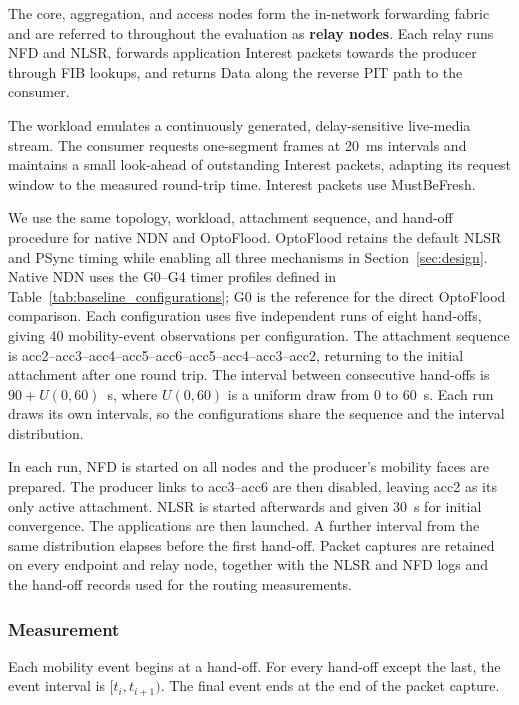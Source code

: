 \documentclass[10pt,conference]{IEEEtran}
\begin{document}
The core, aggregation, and access nodes form the in-network forwarding fabric and are referred to throughout the evaluation as \textbf{relay nodes}. Each relay runs NFD and NLSR, forwards application Interest packets towards the producer through FIB lookups, and returns Data along the reverse PIT path to the consumer.

The workload emulates a continuously generated, delay-sensitive live-media stream. The consumer requests one-segment frames at 20~ms intervals and maintains a small look-ahead of outstanding Interest packets, adapting its request window to the measured round-trip time. Interest packets use MustBeFresh.

We use the same topology, workload, attachment sequence, and hand-off procedure for native NDN and OptoFlood. OptoFlood retains the default NLSR and PSync timing while enabling all three mechanisms in Section~\ref{sec:design}. Native NDN uses the G0--G4 timer profiles defined in Table~\ref{tab:baseline_configurations}; G0 is the reference for the direct OptoFlood comparison. Each configuration uses five independent runs of eight hand-offs, giving 40 mobility-event observations per configuration. The attachment sequence is acc2--acc3--acc4--acc5--acc6--acc5--acc4--acc3--acc2, returning to the initial attachment after one round trip. The interval between consecutive hand-offs is $90 + U(0,60)$~s, where $U(0,60)$ is a uniform draw from 0 to 60~s. Each run draws its own intervals, so the configurations share the sequence and the interval distribution.

In each run, NFD is started on all nodes and the producer's mobility faces are prepared. The producer links to acc3--acc6 are then disabled, leaving acc2 as its only active attachment. NLSR is started afterwards and given 30~s for initial convergence. The applications are then launched. A further interval from the same distribution elapses before the first hand-off. Packet captures are retained on every endpoint and relay node, together with the NLSR and NFD logs and the hand-off records used for the routing measurements.

\subsubsection{Measurement}
\label{sec:evaluation:measurement}

Each mobility event begins at a hand-off. For every hand-off except the last, the event interval is $[t_i, t_{i+1})$. The final event ends at the end of the packet capture.
\end{document}
